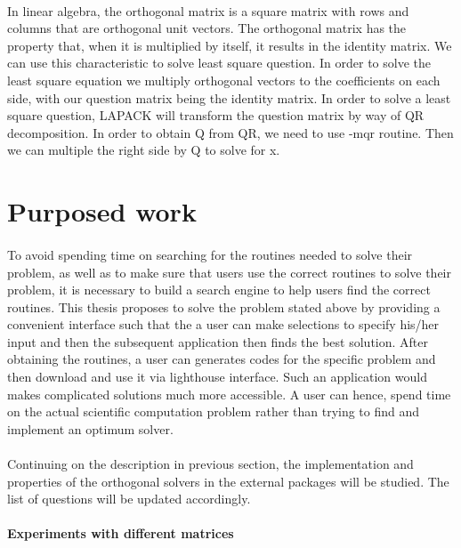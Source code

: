 \documentclass[pdftex,12pt,a4paper]{article}
\begin{document}
\paragraph{}
In linear algebra, the orthogonal matrix is a square matrix with rows and columns that are orthogonal unit vectors.  The orthogonal matrix has the property that, when it is multiplied by itself, it results in the identity matrix. We can use this characteristic to solve least square question. In order to solve the least square equation we multiply orthogonal vectors to the coefficients on each side, with our question matrix being the identity matrix. In order to solve a least square question, LAPACK will transform the question matrix by way of QR decomposition. In order to obtain Q from QR, we need to use -mqr routine. Then we can multiple the right side by Q to solve for x. 

\section{Purposed work}
\paragraph{}
To avoid spending time on searching for the routines needed to solve their problem, as well as to make sure that users use the correct routines to solve their problem, it is necessary to build a search engine to help users find the correct routines. This thesis proposes to solve the problem stated above by providing a convenient interface such that the a user can make selections to specify his/her input and then the subsequent application then finds the best solution. After obtaining the routines, a user can generates codes for the specific problem and then download and use it via lighthouse interface. Such an application would makes complicated solutions much more accessible. A user can hence, spend time on the actual scientific computation problem rather than trying to find and implement an optimum solver. 

\paragraph{}
Continuing on the description in previous section, the implementation and properties of the orthogonal solvers in the external packages will be studied. The list of questions will be updated accordingly.\\
\\
\textbf{Experiments with different matrices}\\
\end{document}

